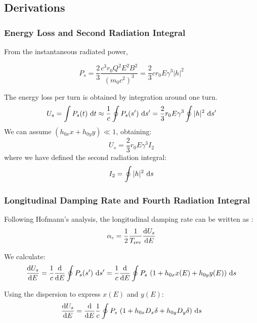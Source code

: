 \subsection{Derivations}
\subsubsection{Energy Loss and Second Radiation Integral}
\label{sec:enelossandi2}

From the instantaneous radiated power,

\begin{equation}
    P_s = \frac{2}{3}\frac{c^3 r_0 Q^2 E^2 B^2}{(m_0 c^2)^3} = \frac{2}{3} c r_0 E \gamma^3 |h|^2
    \label{eq:instpower}
\end{equation}

The energy loss per turn is obtained by integration around one turn.
\begin{equation}
U_s = \int P_s(t) \ \text{d} t \approx \frac{1}{c} \oint P_s(s') \ \text{d} s'
= \frac{2}{3} r_0 E \gamma^3 \oint |h|^2 \ \text{d} s'
\end{equation}
We can assume $(h_{0x}x + h_{0y}y) \ll 1$, obtaining:
\begin{equation}
\label{eq:enelossturn}
U_s =\frac{2}{3} r_0 E \gamma^3 I_{2}
\end{equation}
where we have defined the second radiation integral:
\begin{equation}
I_2     = \oint |h|^2 \ \text{d} s
\end{equation}

\subsubsection{Longitudinal Damping Rate and Fourth Radiation Integral}
\label{sec:longdampandi4}

Following Hofmann's analysis, the longitudinal damping rate can be written as \cite{hofmann_2004}:
\begin{equation}
    \alpha_\epsilon = \frac{1}{2} \frac{1}{T_\text{rev}} \frac{\text{d} {U_s}}{\text{d} {E}}
    \label{eq:alphadamp}
\end{equation}

We calculate:
\begin{equation}
    \frac{\text{d} {U_s}}{\text{d} {E}} = \frac{1}{c} \frac{\text{d} {}}{\text{d} {E}} \oint P_s(s') \ \text{d} s' = \frac{1}{c} \frac{\text{d} {}}{\text{d} {E}} \oint P_s \ (1 + h_{0x}x(E) + h_{0y}y(E))\ \text{d} s
    \label{eq:dUdEoint}
\end{equation}

Using the dispersion to express $x(E)$ and $y(E)$:
\begin{equation}
    \frac{\text{d} {U_s}}{\text{d} {E}} = \frac{\text{d} {}}{\text{d} {E}} \frac{1}{c} \oint P_s \ (1 + h_{0x}D_x \delta + h_{0y} D_y \delta)\ \text{d} s
\end{equation}

